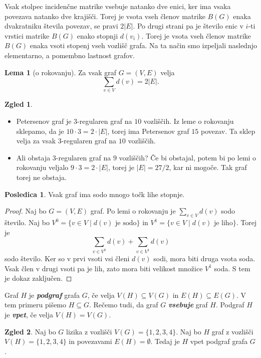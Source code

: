 \documentclass[11pt]{book}
\def\definicija{\color{rdeca}\bf\em}
\theoremstyle{definition}
\theoremstyle{zgled}
\newtheorem*{zgled}{Zgled}
\theoremstyle{odprtproblem}
\theoremstyle{domacanaloga}
\newenvironment{dokaz}
    {\color{siva}\begin{proof}}
    {\end{proof}}
\theoremstyle{izrek}
\newtheorem*{lema}{Lema}
\newtheorem*{posledica}{Posledica}
\begin{document}
Vsak stolpec incidenčne matrike vsebuje natanko dve enici, ker ima vsaka povezava natanko dve krajišči. Torej je vsota vseh členov matrike $B(G)$ enaka dvakratniku števila povezav, se pravi $2 |E|$. Po drugi strani pa je število enic v $i$-ti vrstici matrike $B(G)$ enako stopnji $d(v_i)$. Torej je vsota vseh členov matrike $B(G)$ enaka vsoti stopenj vseh vozlišč grafa. Na ta način smo izpeljali naslednjo elementarno, a pomembno lastnost grafov.

\begin{lema}[o rokovanju]
    Za vsak graf $G = (V,E)$ velja
    \[
        \sum_{v \in V} d(v) = 2 |E|.
    \]
\end{lema}

\begin{zgled} \leavevmode
    \begin{itemize}
        \item Petersenov graf je $3$-regularen graf na $10$ vozliščih. Iz leme o rokovanju sklepamo, da je $10 \cdot 3 = 2 \cdot |E|$, torej ima Petersenov graf $15$ povezav. Ta sklep velja za vsak $3$-regularen graf na $10$ vozliščih.
        \item Ali obstaja $3$-regularen graf na $9$ vozliščih? Če bi obstajal, potem bi po lemi o rokovanju veljalo $9 \cdot 3 = 2 \cdot |E|$, torej je $|E| = 27/2$, kar ni mogoče. Tak graf torej ne obstaja.
    \end{itemize}
\end{zgled}

\begin{posledica}
Vsak graf ima sodo mnogo točk lihe stopnje.
\end{posledica}
\begin{dokaz}
Naj bo $G = (V,E)$ graf. Po lemi o rokovanju je $\sum_{v \in V} d(v)$ sodo število. Naj bo $V^0 = \{ v \in V \mid \text{$d(v)$ je sodo} \}$ in $V^1 = \{ v \in V \mid \text{$d(v)$ je liho} \}$. Torej je 
\[
    \sum_{v \in V^0} d(v) + \sum_{v \in V^1} d(v)
\]
sodo število. Ker so v prvi vsoti vsi členi $d(v)$ sodi, mora biti druga vsota soda. Vsak člen v drugi vsoti pa je lih, zato mora biti velikost množice $V^1$ soda. S tem je dokaz zaključen.
\end{dokaz}

Graf $H$ je {\definicija podgraf} grafa $G$, če velja $V(H) \subseteq V(G)$ in $E(H) \subseteq E(G)$. V tem primeru pišemo $H \subseteq G$. Rečemo tudi, da graf $G$ {\definicija vsebuje} graf $H$. Podgraf $H$ je {\definicija vpet}, če velja $V(H) = V(G)$.

\begin{zgled}
Naj bo $G$ lizika z vozlišči $V(G) = \{ 1,2,3,4 \}$. Naj bo $H$ graf z vozlišči $V(H) = \{ 1,2,3,4 \}$ in povezavami $E(H) = \emptyset$. Tedaj je $H$ vpet podgraf grafa $G$.
\end{zgled}
\end{document}
